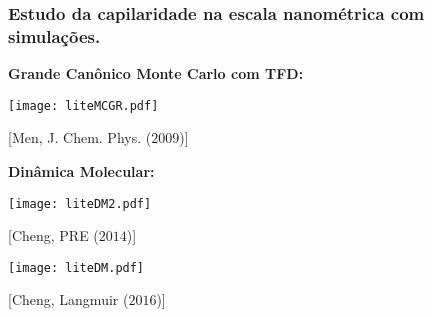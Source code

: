 \documentclass[8pt]{beamer}
\begin{document}
\begin{frame}
\frametitle{Estudo da capilaridade na escala nanométrica com \textbf{simulações}.}
	\begin{minipage}{0.49\textwidth}
		\begin{center}
			{\bf Grande Canônico Monte Carlo com TFD:}		
		
			\texttt{[image: liteMCGR.pdf]}

			{\tiny [Men, J. Chem. Phys. ($2009$)]}
		\end{center}
	\end{minipage}
	\begin{minipage}{0.49\textwidth}
		\vspace{0.8cm} 
		\begin{center}
			{\bf Dinâmica Molecular:}
		
			\texttt{[image: liteDM2.pdf]}
		
			{\tiny [Cheng, PRE ($2014$)]}

			\vspace{0.4cm} 
			\texttt{[image: liteDM.pdf]}

			{\tiny [Cheng, Langmuir ($2016$)]}
		\end{center}
	\end{minipage}
\end{frame}
\end{document}
